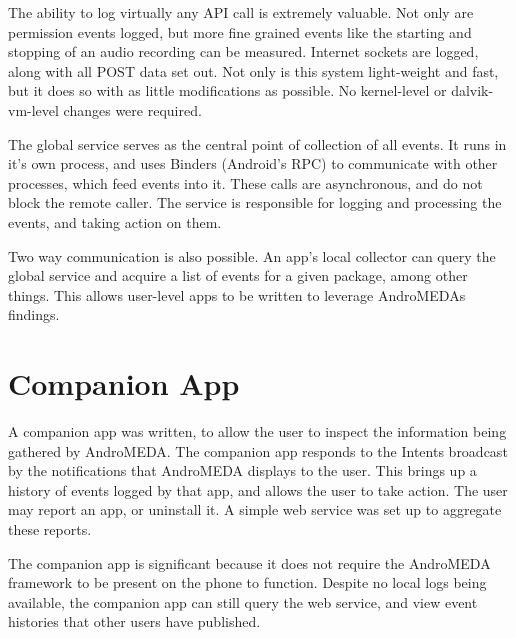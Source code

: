 The ability to log virtually any API call is extremely valuable. Not only are permission events logged, but more fine grained events like the starting and stopping of an audio recording can be measured. Internet sockets are logged, along with all POST data set out. Not only is this system light-weight and fast, but it does so with as little modifications as possible. No kernel-level or dalvik-vm-level changes were required.

The global service serves as the central point of collection of all events. It runs in it's own process, and uses Binders (Android's RPC) to communicate with other processes, which feed events into it. These calls are asynchronous, and do not block the remote caller. The service is responsible for logging and processing the events, and taking action on them.

Two way communication is also possible. An app's local collector can query the global service and acquire a list of events for a given package, among other things. This allows user-level apps to be written to leverage AndroMEDAs findings.

\section{Companion App}
A companion app was written, to allow the user to inspect the information being gathered by AndroMEDA. The companion app responds to the Intents broadcast by the notifications that AndroMEDA displays to the user. This brings up a history of events logged by that app, and allows the user to take action. The user may report an app, or uninstall it. A simple web service was set up to aggregate these reports.

The companion app is significant because it does not require the AndroMEDA framework to be present on the phone to function. Despite no local logs being available, the companion app can still query the web service, and view event histories that other users have published.
